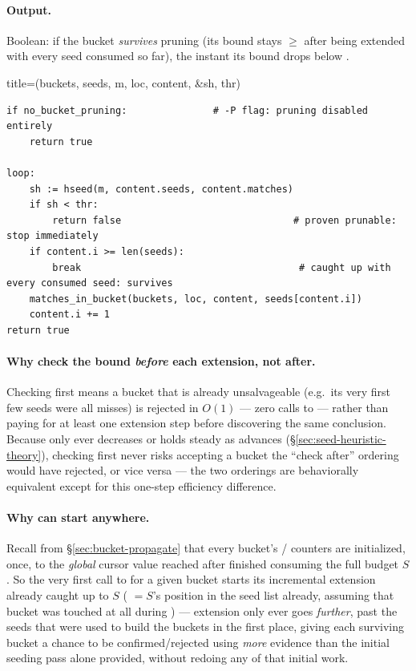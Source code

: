 \paragraph{Output.} Boolean:  if the bucket \emph{survives} pruning (its bound stays
$\ge$  after being extended with every seed consumed so far),  the instant
its bound drops below .

\begin{algobox}{title={(buckets, seeds, m, loc, content, \&sh, thr)}}
\begin{verbatim}
if no_bucket_pruning:               # -P flag: pruning disabled entirely
    return true

loop:
    sh := hseed(m, content.seeds, content.matches)
    if sh < thr:
        return false                              # proven prunable: stop immediately
    if content.i >= len(seeds):
        break                                      # caught up with every consumed seed: survives
    matches_in_bucket(buckets, loc, content, seeds[content.i])
    content.i += 1
return true
\end{verbatim}
\end{algobox}

\paragraph{Why check the bound \emph{before} each extension, not after.} Checking first means a
bucket that is already unsalvageable (e.g.\ its very first few seeds were all misses) is rejected
in $O(1)$ --- zero calls to  --- rather than paying for at least one
extension step before discovering the same conclusion. Because  only ever decreases
or holds steady as  advances (\S\ref{sec:seed-heuristic-theory}), checking first
never risks accepting a bucket the ``check after'' ordering would have rejected, or vice versa ---
the two orderings are behaviorally equivalent except for this one-step efficiency difference.

\paragraph{Why  can start anywhere.} Recall from
\S\ref{sec:bucket-propagate} that every bucket's / counters are initialized,
once, to the \emph{global} cursor value reached after  finished consuming the
full budget $S$. So the very first call to  for a given bucket starts
its incremental extension already caught up to $S$ ( $= S$'s position in the seed
list already, assuming that bucket was touched at all during ) --- extension
only ever goes \emph{further}, past the seeds that were used to build the buckets in the first
place, giving each surviving bucket a chance to be confirmed/rejected using \emph{more} evidence
than the initial seeding pass alone provided, without redoing any of that initial work.

